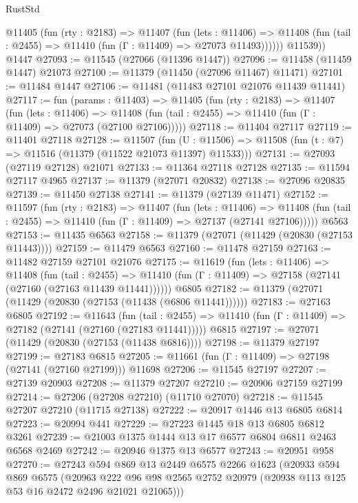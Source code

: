 \begin{lexlean}{RustStd}
\begin{coremodule}
          @11405
            (fun (rty : @2183) =>
            @11407
              (fun (lets : @11406) =>
              @11408 (fun (tail : @2455) => @11410 (fun (Γ : @11409) => @27073 @11493))))))
        @11539))
    @1447
@27093 := @11545 (@27066 (@11396 @1447))
@27096 := @11458 (@11459 @1447) @21073
@27100 := @11379 (@11450 (@27096 @11467) @11471)
@27101 := @11484 @1447
@27106 := @11481 (@11483 @27101 @21076 @11439 @11441)
@27117 := fun (params : @11403) =>
  @11405
    (fun (rty : @2183) =>
    @11407
      (fun (lets : @11406) =>
      @11408 (fun (tail : @2455) => @11410 (fun (Γ : @11409) => @27073 (@27100 @27106)))))
@27118 := @11404 @27117
@27119 := @11401 @27118
@27128 := @11507
    (fun (U : @11506) => @11508 (fun (t : @7) => @11516 (@11379 (@11522 @21073 @11397) @11533)))
@27131 := @27093 (@27119 @27128) @21071
@27133 := @11364 @27118 @27128
@27135 := @11594 @27117 @4965
@27137 := @11379 (@27071 @20832)
@27138 := @27096 @20835
@27139 := @11450 @27138
@27141 := @11379 (@27139 @11471)
@27152 := @11597
    (fun (rty : @2183) =>
    @11407
      (fun (lets : @11406) =>
      @11408 (fun (tail : @2455) => @11410 (fun (Γ : @11409) => @27137 (@27141 @27106)))))
    @6563
@27153 := @11435 @6563
@27158 := @11379 (@27071 (@11429 (@20830 (@27153 @11443))))
@27159 := @11479 @6563
@27160 := @11478 @27159
@27163 := @11482 @27159 @27101 @21076
@27175 := @11619
    (fun (lets : @11406) =>
    @11408
      (fun (tail : @2455) =>
      @11410 (fun (Γ : @11409) => @27158 (@27141 (@27160 (@27163 @11439 @11441))))))
    @6805
@27182 := @11379 (@27071 (@11429 (@20830 (@27153 (@11438 (@6806 @11441))))))
@27183 := @27163 @6805
@27192 := @11643
    (fun (tail : @2455) => @11410 (fun (Γ : @11409) => @27182 (@27141 (@27160 (@27183 @11441)))))
    @6815
@27197 := @27071 (@11429 (@20830 (@27153 (@11438 @6816))))
@27198 := @11379 @27197
@27199 := @27183 @6815
@27205 := @11661 (fun (Γ : @11409) => @27198 (@27141 (@27160 @27199))) @11698
@27206 := @11545 @27197
@27207 := @27139 @20903
@27208 := @11379 @27207
@27210 := @20906 @27159 @27199
@27214 := @27206 (@27208 @27210) (@11710 @27070)
@27218 := @11545 @27207 @27210 (@11715 @27138)
@27222 := @20917 @1446 @13 @6805 @6814
@27223 := @20994 @441
@27229 := @27223 @1445 @18 @13 @6805 @6812 @3261
@27239 := @21003 @1375 @1444 @13 @17 @6577 @6804 @6811 @2463 @6568 @2469
@27242 := @20946 @1375 @13 @6577
@27243 := @20951 @958
@27270 := @27243
    @594
    @869
    @13
    @2449
    @6575
    @2266
    @1623
    (@20933
      @594
      @869
      @6575
      (@20963 @222 @96 @98 @2565 @2752 @20979 (@20938 @113 @125 @53 @16 @2472 @2496 @21021 @21065)))

\end{coremodule}
\end{lexlean}

